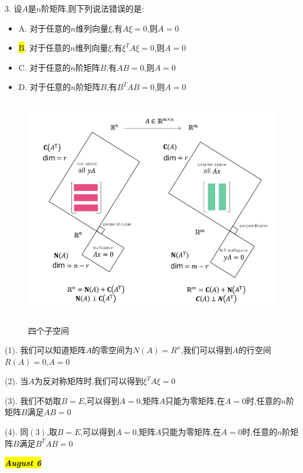 3. 设$A$是$n$阶矩阵,则下列说法错误的是:  
\begin{itemize}
	\item A. 对于任意的$n$维列向量$\xi$,有$A\xi=0$,则$A=0$
	\item \hl{B}. 对于任意的$n$维列向量$\xi$,有$\xi^{T}A\xi=0$,则$A=0$
	\item C. 对于任意的$n$阶矩阵$B$,有$AB=0$,则$A=0$
	\item D. 对于任意的$n$阶矩阵$B$,有$B^{T}AB=0$,则$A=0$
\end{itemize}
\begin{figure}[ht]
	\centering
	\includegraphics[width=13cm,height=10cm]{"figure/Question/四个子空间.png"}
	\caption{四个子空间}
\end{figure} 
\begin{solution}

	(1). 我们可以知道矩阵$A$的零空间为$N(A)=R^{n}$,我们可以得到$A$的行空间$R(A)=0$,$A=0$
	
	(2). 当$A$为反对称矩阵时,我们可以得到$\xi^{T}A\xi=0$
	
	(3). 我们不妨取$B=E$,可以得到$A=0$,矩阵$A$只能为零矩阵,在$A=0$时,任意的$n$阶矩阵$B$满足$AB=0$
	
	(4). 同$(3)$,取$B=E$,可以得到$A=0$,矩阵$A$只能为零矩阵,在$A=0$时,任意的$n$阶矩阵$B$满足$B^{T}AB=0$
\end{solution}

\hl{\textbf{\textit{August 6}}}

